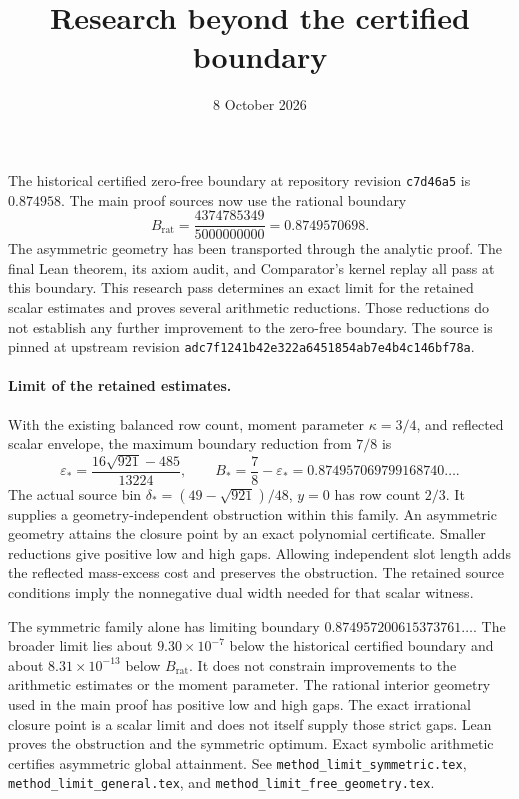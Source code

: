 \documentclass[11pt]{article}
\title{Research beyond the certified boundary}
\author{}
\date{8 October 2026}
\begin{document}
\maketitle

The historical certified zero-free boundary at repository revision
\texttt{c7d46a5} is $0.874958$. The main proof sources now use the rational
boundary
\[
 B_{\mathrm{rat}}=\frac{4374785349}{5000000000}=0.8749570698.
\]
The asymmetric geometry has been transported through the analytic proof.
The final Lean theorem, its axiom audit, and Comparator's kernel replay
all pass at this boundary.
This research pass determines an exact limit for the retained scalar
estimates and proves several arithmetic reductions. Those reductions
do not establish any further improvement to the zero-free boundary.
The source is pinned at upstream revision
\texttt{adc7f1241b42e322a6451854ab7e4b4c146bf78a}.

\paragraph{Limit of the retained estimates.}
With the existing balanced row count, moment parameter $\kappa=3/4$,
and reflected scalar envelope, the maximum boundary reduction from
$7/8$ is
\[
 \varepsilon_* = \frac{16\sqrt{921}-485}{13224},\qquad
 B_* = \frac78-\varepsilon_* = 0.874957069799168740\ldots.
\]
The actual source bin
$\delta_*=(49-\sqrt{921})/48$, $y=0$ has row count $2/3$.
It supplies a geometry-independent obstruction within this family.
An asymmetric geometry attains the closure point by an exact polynomial
certificate. Smaller reductions give positive low and high gaps.
Allowing independent slot length adds the reflected mass-excess cost
and preserves the obstruction. The retained source conditions imply
the nonnegative dual width needed for that scalar witness.

The symmetric family alone has limiting boundary
$0.874957200615373761\ldots$. The broader limit lies about
$9.30\times10^{-7}$ below the historical certified boundary and about
$8.31\times10^{-13}$ below $B_{\mathrm{rat}}$.
It does not constrain improvements to the arithmetic estimates or
the moment parameter. The rational interior geometry used in the main
proof has positive low and high gaps. The exact irrational closure
point is a scalar limit and does not itself supply those strict gaps.
Lean proves the obstruction and the symmetric optimum.
Exact symbolic arithmetic certifies asymmetric global attainment.
See \texttt{method\_limit\_symmetric.tex},
\texttt{method\_limit\_general.tex}, and
\texttt{method\_limit\_free\_geometry.tex}.
\end{document}
